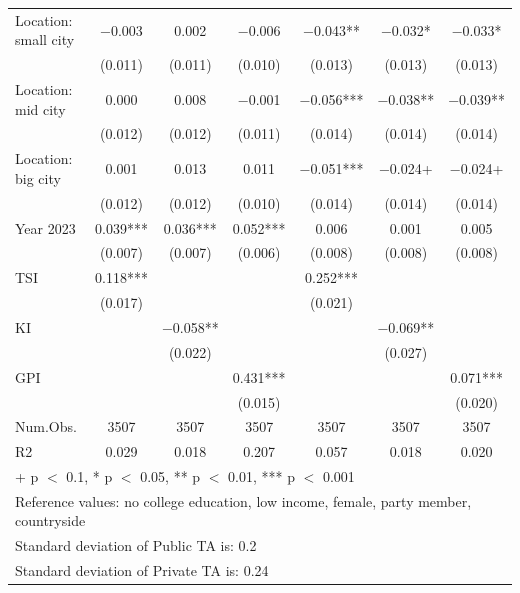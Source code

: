 \documentclass[
  letterpaper,
  DIV=11,
  numbers=noendperiod]{scrartcl}
\begin{document}
\begin{table}
{\begin{tabular}[t]{lcccccc}
Location: small city & \num{-0.003} & \num{0.002} & \num{-0.006} & \num{-0.043}** & \num{-0.032}* & \num{-0.033}*\\
 & (\num{0.011}) & (\num{0.011}) & (\num{0.010}) & (\num{0.013}) & (\num{0.013}) & (\num{0.013})\\
Location: mid city & \num{0.000} & \num{0.008} & \num{-0.001} & \num{-0.056}*** & \num{-0.038}** & \num{-0.039}**\\
 & (\num{0.012}) & (\num{0.012}) & (\num{0.011}) & (\num{0.014}) & (\num{0.014}) & (\num{0.014})\\
Location: big city & \num{0.001} & \num{0.013} & \num{0.011} & \num{-0.051}*** & \num{-0.024}+ & \num{-0.024}+\\
 & (\num{0.012}) & (\num{0.012}) & (\num{0.010}) & (\num{0.014}) & (\num{0.014}) & (\num{0.014})\\
Year 2023 & \num{0.039}*** & \num{0.036}*** & \num{0.052}*** & \num{0.006} & \num{0.001} & \num{0.005}\\
 & (\num{0.007}) & (\num{0.007}) & (\num{0.006}) & (\num{0.008}) & (\num{0.008}) & (\num{0.008})\\
TSI & \num{0.118}*** &  &  & \num{0.252}*** &  & \\
 & (\num{0.017}) &  &  & (\num{0.021}) &  & \\
KI &  & \num{-0.058}** &  &  & \num{-0.069}** & \\
 &  & (\num{0.022}) &  &  & (\num{0.027}) & \\
GPI &  &  & \num{0.431}*** &  &  & \num{0.071}***\\
 &  &  & (\num{0.015}) &  &  & (\num{0.020})\\
\midrule
Num.Obs. & \num{3507} & \num{3507} & \num{3507} & \num{3507} & \num{3507} & \num{3507}\\
R2 & \num{0.029} & \num{0.018} & \num{0.207} & \num{0.057} & \num{0.018} & \num{0.020}\\
\bottomrule
\multicolumn{7}{l}{\rule{0pt}{1em}+ p $<$ 0.1, * p $<$ 0.05, ** p $<$ 0.01, *** p $<$ 0.001}\\
\multicolumn{7}{l}{\rule{0pt}{1em}Reference values: no college education, low income, female, party member, countryside}\\
\multicolumn{7}{l}{\rule{0pt}{1em}Standard deviation of Public TA is:  0.2}\\
\multicolumn{7}{l}{\rule{0pt}{1em}Standard deviation of Private TA is:  0.24}\\
\end{tabular}

}

\end{table}%
\end{document}
